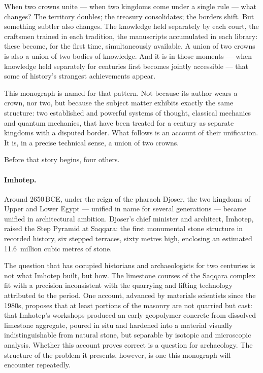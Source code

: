 

\noindent
When two crowns unite --- when two kingdoms come under a single rule ---
what changes?
The territory doubles; the treasury consolidates; the borders shift.
But something subtler also changes.
The knowledge held separately by each court, the craftsmen trained in each
tradition, the manuscripts accumulated in each library: these become, for
the first time, simultaneously available.
A union of two crowns is also a union of two bodies of knowledge.
And it is in those moments --- when knowledge held separately for centuries
first becomes jointly accessible --- that some of history's strangest
achievements appear.

This monograph is named for that pattern.
Not because its author wears a crown, nor two, but because the subject
matter exhibits exactly the same structure: two established and powerful
systems of thought, classical mechanics and quantum mechanics, that have
been treated for a century as separate kingdoms with a disputed border.
What follows is an account of their unification.
It is, in a precise technical sense, a union of two crowns.

Before that story begins, four others.

\bigskip
\paragraph{Imhotep.}

Around 2650\,BCE, under the reign of the pharaoh Djoser, the two
kingdoms of Upper and Lower Egypt --- unified in name for several
generations --- became unified in architectural ambition.
Djoser's chief minister and architect, Imhotep, raised the Step Pyramid
at Saqqara: the first monumental stone structure in recorded history,
six stepped terraces, sixty metres high, enclosing an estimated
11.6~million cubic metres of stone.

The question that has occupied historians and archaeologists for two
centuries is not what Imhotep built, but how.
The limestone courses of the Saqqara complex fit with a precision
inconsistent with the quarrying and lifting technology attributed to
the period.
One account, advanced by materials scientists since the 1980s, proposes
that at least portions of the masonry are not quarried but cast:
that Imhotep's workshops produced an early geopolymer concrete from
dissolved limestone aggregate, poured in situ and hardened into a
material visually indistinguishable from natural stone, but separable
by isotopic and microscopic analysis.
Whether this account proves correct is a question for archaeology.
The structure of the problem it presents, however, is one this monograph
will encounter repeatedly.

